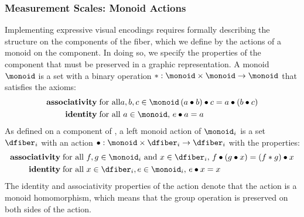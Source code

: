 \documentclass[../main.tex]{subfiles}
\begin{document}
\subsubsection{Measurement Scales: Monoid Actions}
\label{sec:math:data:monoid}
Implementing expressive visual encodings requires formally describing the structure on the components of the fiber, which we define by the actions of a monoid on the component. In doing so, we specify the properties of the component that must be preserved in a graphic representation. A monoid \cite{Monoid2021} $\monoid$ is a set with a binary operation $\ast:\monoid \times \monoid\rightarrow \monoid$ that satisfies the axioms:
\begin{align*}
    \textbf{associativity}\; & \text{for all} a, b, c \in \monoid \, (a \bullet b) \bullet c = a \bullet (b \bullet c)\\
    \textbf{identity}\; & \text{for all } a\in \monoid,\,  e\bullet a = a 
\end{align*} 
As defined on a component of \dfiber, a left monoid action \cite{SemigroupAction2021,nlab:action} of $\monoid_i$ is a set $\dfiber_i$ with an action $\bullet: \monoid\times \dfiber_i \rightarrow \dfiber_i$ with the properties:
\begin{align*}
    \textbf{associativity}\;& \text{for all } f,g \in \monoid_i \text{ and } x\in \dfiber_i,\, f\bullet(g\bullet x) = (f\ast g) \bullet x\\
    \textbf{identity}\;& \text{for all } x\in \dfiber_i, e\in \monoid_i,\,  e\bullet x = x 
\end{align*}
The identity and associativity properties of the action denote that the action is a monoid homomorphism, which means that the group operation is preserved on both sides of the action\cite{weissteinGroupHomomorphism}. 
\end{document}
